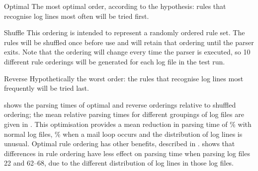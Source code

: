 \begin{eqlist}

    \item [Optimal]  The most optimal order, according to the hypothesis:
        rules that recognise log lines most often will be tried first.

    \item [Shuffle] This ordering is intended to represent a randomly
        ordered rule set.  The rules will be shuffled once before use and
        will retain that ordering until the parser exits.  Note that the
        ordering will change every time the parser is executed, so 10
        different rule orderings will be generated for each log file in the
        test run.

    \item [Reverse] Hypothetically the worst order: the rules that
        recognise log lines most frequently will be tried last.

\end{eqlist}

 shows the
parsing times of optimal and reverse orderings relative to shuffled
ordering; the mean relative parsing times for different groupings of log
files are given in .  This optimisation provides a mean reduction in parsing time of
\%
with normal log files,
\%
when a mail loop occurs and the distribution of log lines is unusual.
Optimal rule ordering has other benefits, described in
.   shows that differences in rule
ordering have less effect on parsing time when parsing log files 22 and
62--68, due to the different distribution of log lines in those log files.






